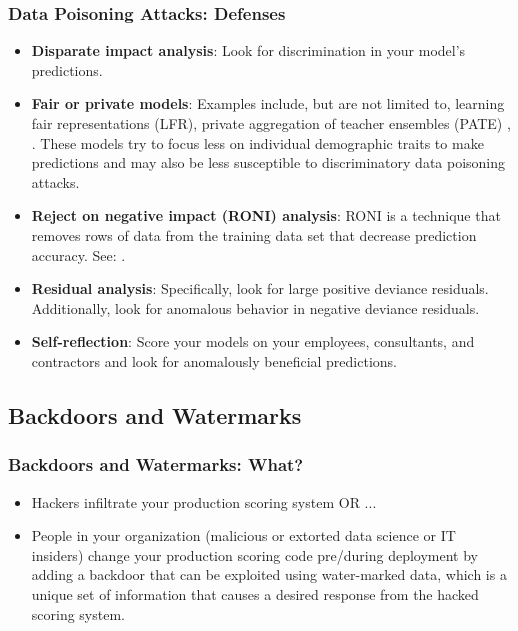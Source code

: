 \documentclass[11pt,
               aspectratio=169,
               hyperref={colorlinks}
               ]{beamer}
\begin{document}
			\begin{frame}[label={slide:data_poisoning_defense}]
		
				\frametitle{Data Poisoning Attacks: \textbf{Defenses}}
				
				\begin{itemize}
					\item \textbf{Disparate impact analysis}: Look for discrimination in your model’s predictions. 
					\item \textbf{Fair or private models}: Examples include, but are not limited to, learning fair representations (LFR), private aggregation of teacher ensembles (PATE) \cite{pate}, \cite{lfr}. These models try to focus less on individual demographic traits to make predictions and may also be less susceptible to discriminatory data poisoning attacks.
					\item \textbf{Reject on negative impact (RONI) analysis}: RONI is a technique that removes rows of data from the training data set that decrease prediction accuracy.  See: \textit{} \cite{security_of_ml}. 		
					\item \textbf{Residual analysis}: Specifically, look for large positive deviance residuals. Additionally, look for anomalous behavior in negative deviance residuals.
					\item \textbf{Self-reflection}: Score your models on your employees, consultants, and contractors and look for anomalously beneficial predictions.
				\end{itemize}	
			\end{frame}
		
		\subsection{Backdoors and Watermarks}
			
			\begin{frame}
		
				\frametitle{Backdoors and Watermarks: \textbf{What?}}
				\begin{itemize}
				\item Hackers infiltrate your production scoring system OR ... 
				\item People in your organization (malicious or extorted data science or IT insiders) change your production scoring code pre/during deployment by adding a backdoor that can be exploited using water-marked data, which is a unique set of information that causes a desired response from the hacked scoring system.
				\end{itemize}
				\vspace{20pt}
			\end{frame}
		
\end{document}
